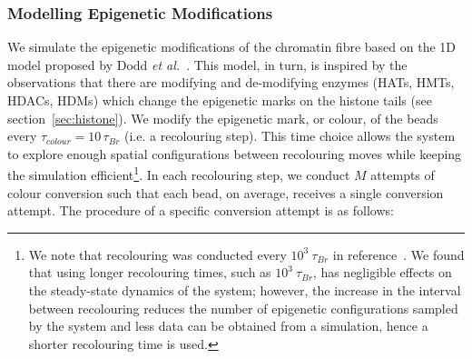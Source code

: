 \documentclass[12pt]{article}
\newcommand{\etal}{\emph{et al.}}
\begin{document}
\subsubsection{Modelling Epigenetic Modifications}
\label{sec:recolouring}
We simulate the epigenetic modifications of the chromatin fibre based on the 1D model proposed by Dodd \etal~\cite{dodd2007}. This model, in turn, is inspired by the observations that there are modifying and de-modifying enzymes (HATs, HMTs, HDACs, HDMs) which change the epigenetic marks on the histone tails (see section~\ref{sec:histone}). We modify the epigenetic mark, or colour, of the beads every $\tau_{colour} = 10\,\tau_{Br}$ (i.e. a recolouring step). This time choice allows the system to explore enough spatial configurations between recolouring moves while keeping the simulation efficient\footnote{We note that recolouring was conducted every $10^3~\tau_{Br}$ in reference~\cite{michieletto2016}. We found that using longer recolouring times, such as $10^3~\tau_{Br}$, has negligible effects on the steady-state dynamics of the system; however, the increase in the interval between recolouring reduces the number of epigenetic configurations sampled by the system and less data can be obtained from a simulation, hence a shorter recolouring time is used.}. In each recolouring step, we conduct $M$ attempts of colour conversion such that each bead, on average, receives a single conversion attempt. The procedure of a specific conversion attempt is as follows: 
\end{document}
